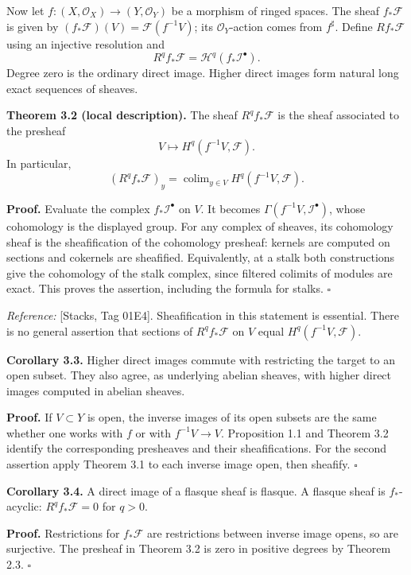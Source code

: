 \documentclass[11pt]{article}
\begin{document}
Now let \(f:(X,\mathcal O_X)\to(Y,\mathcal O_Y)\) be a morphism of
ringed spaces. The sheaf \(f_*\mathcal F\) is given by
\((f_*\mathcal F)(V)=\mathcal F(f^{-1}V)\); its \(\mathcal O_Y\)-action
comes from \(f^\sharp\). Define \(Rf_*\mathcal F\) using an injective
resolution and \[
R^qf_*\mathcal F=\mathcal H^q(f_*\mathcal I^\bullet).
\] Degree zero is the ordinary direct image. Higher direct images form
natural long exact sequences of sheaves.

\textbf{Theorem 3.2 (local description).} The sheaf \(R^qf_*\mathcal F\)
is the sheaf associated to the presheaf \[
V\longmapsto H^q(f^{-1}V,\mathcal F).
\] In particular, \[
(R^qf_*\mathcal F)_y
=\mathop{\mathrm{colim}}_{y\in V}H^q(f^{-1}V,\mathcal F).
\]

\textbf{Proof.} Evaluate the complex \(f_*\mathcal I^\bullet\) on \(V\).
It becomes \(\Gamma(f^{-1}V,\mathcal I^\bullet)\), whose cohomology is
the displayed group. For any complex of sheaves, its cohomology sheaf is
the sheafification of the cohomology presheaf: kernels are computed on
sections and cokernels are sheafified. Equivalently, at a stalk both
constructions give the cohomology of the stalk complex, since filtered
colimits of modules are exact. This proves the assertion, including the
formula for stalks. \(\square\)

\emph{Reference:} {[}Stacks, Tag 01E4{]}. Sheafification in this
statement is essential. There is no general assertion that sections of
\(R^qf_*\mathcal F\) on \(V\) equal \(H^q(f^{-1}V,\mathcal F)\).

\textbf{Corollary 3.3.} Higher direct images commute with restricting
the target to an open subset. They also agree, as underlying abelian
sheaves, with higher direct images computed in abelian sheaves.

\textbf{Proof.} If \(V\subset Y\) is open, the inverse images of its
open subsets are the same whether one works with \(f\) or with
\(f^{-1}V\to V\). Proposition 1.1 and Theorem 3.2 identify the
corresponding presheaves and their sheafifications. For the second
assertion apply Theorem 3.1 to each inverse image open, then sheafify.
\(\square\)

\textbf{Corollary 3.4.} A direct image of a flasque sheaf is flasque. A
flasque sheaf is \(f_*\)-acyclic: \(R^qf_*\mathcal F=0\) for \(q>0\).

\textbf{Proof.} Restrictions for \(f_*\mathcal F\) are restrictions
between inverse image opens, so are surjective. The presheaf in Theorem
3.2 is zero in positive degrees by Theorem 2.3. \(\square\)
\end{document}
